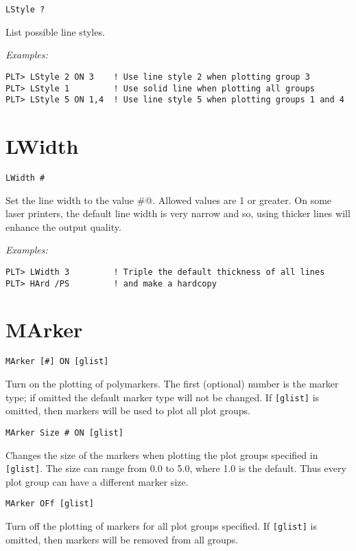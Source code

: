 \medskip
\begin{verbatim}
LStyle ?
\end{verbatim}
   List possible line styles.

\medskip\noindent
{\em Examples:}
\begin{verbatim}
PLT> LStyle 2 ON 3    ! Use line style 2 when plotting group 3
PLT> LStyle 1         ! Use solid line when plotting all groups
PLT> LStyle 5 ON 1,4  ! Use line style 5 when plotting groups 1 and 4
\end{verbatim}

\section*{LWidth}
\begin{verbatim}
LWidth #
\end{verbatim}
   Set the line width to the value \verb@#@.  Allowed values are 1 or greater.
On some laser printers, the default line width is very narrow and
so, using thicker lines will enhance the output quality.

\medskip\noindent
{\em Examples:}
\begin{verbatim}
PLT> LWidth 3         ! Triple the default thickness of all lines
PLT> HArd /PS         ! and make a hardcopy
\end{verbatim}

\section*{MArker}
\begin{verbatim}
MArker [#] ON [glist]
\end{verbatim}
   Turn on the plotting of polymarkers.  The first (optional) number
is the marker type; if omitted the default marker type will not be
changed.  If {\tt [glist]} is omitted, then markers will be used to plot
all plot groups.

\medskip
\begin{verbatim}
MArker Size # ON [glist]
\end{verbatim}
   Changes the size of the markers when plotting the plot groups specified
in {\tt [glist]}.  The size can range from 0.0 to 5.0, where 1.0 is
the default.  Thus every plot group can have a different marker size.

\medskip
\begin{verbatim}
MArker OFf [glist]
\end{verbatim}
   Turn off the plotting of markers for all plot groups specified.
If {\tt [glist]} is omitted, then markers will be removed from all groups.

